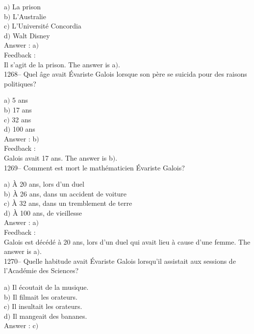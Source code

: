 \documentclass[letterpaper, 12pt]{article}
\begin{document}
a$)$ La prison \\
b$)$ L'Australie \\
c$)$ L'Universit\'e Concordia \\
d$)$ Walt Disney\\

Answer : a$)$\\

Feedback : \\
Il s'agit de la prison.
The answer is a$)$.\\

1268-- Quel \^age avait \'Evariste Galois lorsque son p\`ere se
suicida pour des raisons politiques?

a$)$ 5 ans \\
b$)$ 17 ans \\
c$)$ 32 ans \\
d$)$ 100 ans\\

Answer : b$)$\\

Feedback : \\
Galois avait 17 ans.
The answer is b$)$.\\

1269-- Comment est mort le math\'ematicien \'Evariste Galois?

a$)$ \`A 20 ans, lors d'un duel \\
b$)$ \`A 26 ans, dans un accident de voiture \\
c$)$ \`A 32 ans, dans un tremblement de terre \\
d$)$ \`A 100 ans, de vieillesse\\

Answer : a$)$\\

Feedback : \\
Galois est d\'ec\'ed\'e \`a 20 ans, lors d'un duel
qui avait lieu \`a cause d'une femme.
The answer is a$)$.\\

1270-- Quelle habitude avait \'Evariste Galois lorsqu'il assistait
aux sessions de l'Acad\'emie des Sciences?

a$)$ Il \'ecoutait de la musique. \\
b$)$ Il filmait les orateurs. \\
c$)$ Il insultait les orateurs. \\
d$)$ Il mangeait des bananes.\\

Answer : c$)$\\
\end{document}
